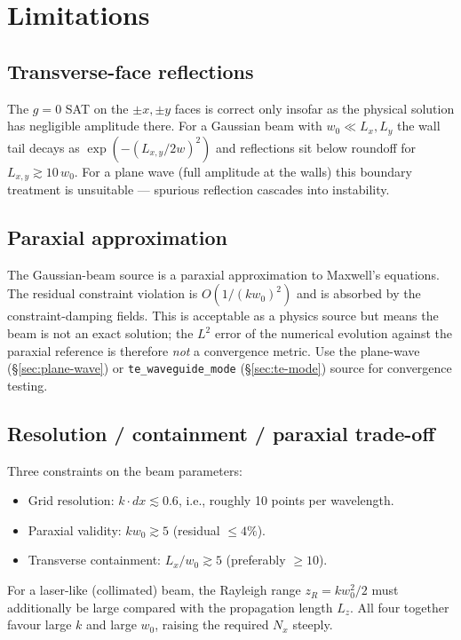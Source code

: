 \documentclass[11pt]{article}
\begin{document}
\section{Limitations}
\label{sec:limitations}

\subsection{Transverse-face reflections}

The $g = 0$ SAT on the $\pm x, \pm y$ faces is correct only
insofar as the physical solution has negligible amplitude there.
For a Gaussian beam with $w_0 \ll L_x, L_y$ the wall tail decays
as $\exp(-(L_{x,y}/2 w)^2)$ and reflections sit below roundoff for
$L_{x,y} \gtrsim 10\, w_0$.  For a plane wave (full amplitude at
the walls) this boundary treatment is unsuitable --- spurious
reflection cascades into instability.

\subsection{Paraxial approximation}

The Gaussian-beam source is a paraxial approximation to Maxwell's
equations.  The residual constraint violation is $O(1/(kw_0)^2)$
and is absorbed by the constraint-damping fields.  This is
acceptable as a physics source but means the beam is not an exact
solution; the $L^2$ error of the numerical evolution against the
paraxial reference is therefore \emph{not} a convergence metric.
Use the plane-wave (\S\ref{sec:plane-wave}) or
\texttt{te\_waveguide\_mode} (\S\ref{sec:te-mode}) source for
convergence testing.

\subsection{Resolution / containment / paraxial trade-off}

Three constraints on the beam parameters:
\begin{itemize}[itemsep=1pt,topsep=2pt]
  \item Grid resolution: $k\cdot dx \lesssim 0.6$, i.e., roughly
        10 points per wavelength.
  \item Paraxial validity: $k w_0 \gtrsim 5$ (residual $\leq 4\%$).
  \item Transverse containment: $L_x/w_0 \gtrsim 5$
        (preferably $\geq 10$).
\end{itemize}
For a laser-like (collimated) beam, the Rayleigh range
$z_R = k w_0^2 / 2$ must additionally be large compared with the
propagation length $L_z$.  All four together favour large $k$ and
large $w_0$, raising the required $N_x$ steeply.
\end{document}

